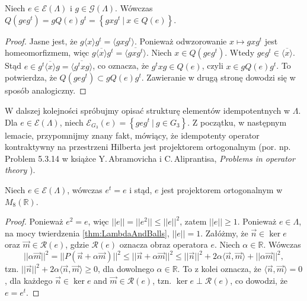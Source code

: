 {\begin{Lemma}
    \label{lem:equivClassesOfQe}
    Niech $e \in \mathcal{E}(\Lambda)$ i $g \in \mathcal{G}(\Lambda)$.
    Wówczas $Q(g e g^{t}) = g Q(e) g^{t} =
    \left \{ g x g^{t} \: | \: x \in Q(e) \right \}$.
\end{Lemma}
\begin{proof}
    Jasne jest, że $g \langle x \rangle g^{t} = \langle g x g^{t} \rangle$.
Ponieważ odwzorowanie $x \mapsto g x g^{t}$ jest homeomorfizmem,
więc $g \overline{\langle x \rangle} g^{t} = \overline{\langle g x g^{t} \rangle}$.
Niech $x \in Q(g e g^{t})$.
Wtedy $g e g^{t} \in \overline{\langle x \rangle}$.
Stąd $e \in g^{t} \overline{\langle x \rangle} g = \overline{\langle g^{t} x g \rangle}$,
co oznacza, że $g^{t} x g \in Q(e)$, czyli
    $x \in g Q(e) g^{t}$.
To potwierdza, że
    $Q(g e g^{t}) \subset g Q(e) g^{t}$.
Zawieranie w drugą stronę dowodzi się w sposób analogiczny.
\end{proof}

W dalszej kolejności spróbujmy opisać strukturę elementów idempotentnych w $\Lambda$.
Dla $e \in \mathcal{E}(\Lambda)$,
niech $\mathcal{E}_{G_{3}}(e) = \left \{ g e g^{t} \: | \: g \in G_{3} \right \}$.
Z początku, w następnym lemacie, przypomnijmy znany fakt,
mówiący, że idempotenty operator kontraktywny na przestrzeni Hilberta
jest projektorem ortogonalnym
(por. np. Problem 5.3.14 w książce
Y.\,Abramovicha i  C.\,Aliprantisa,
\emph{Problems in operator theory}
\cite{Abramovich2002}).
\begin{Lemma}
    \label{lem:eIsProj}
    Niech $e \in \mathcal{E}(\Lambda)$, wówczas $e^{t} = e$ i stąd,
    $e$ jest projektorem ortogonalnym w $M_{8}(\mathbb{R})$.
\end{Lemma}
\begin{proof}
    Ponieważ $e^{2} = e$, więc $||e|| = ||e^{2}|| \leq ||e||^{2}$,
    zatem $||e|| \geq 1$.
    Ponieważ $e \in \Lambda$, na mocy twierdzenia \ref{thm:LambdaAndBalls},
    $||e|| =1$.
Załóżmy, że $\vec{n} \in \ker e$ oraz $\vec{m} \in \mathcal{R}(e)$,
gdzie $\mathcal{R}(e)$ oznacza obraz operatora $e$.
Niech $\alpha \in \mathbb{R}$.
Wówczas
\begin{equation}
    || \alpha \vec{m} ||^{2} = || P (\vec{n} + \alpha \vec{m}) ||^{2} \leq
    || \vec{n} + \alpha \vec{m}||^{2} \leq ||\vec{n}||^{2} +
        2 \alpha \langle \vec{n}, \vec{m} \rangle + || \alpha \vec{m}||^{2},
\end{equation}
tzn. $||\vec{n}||^{2} + 2 \alpha  \langle \vec{n}, \vec{m} \rangle \geq 0$,
dla dowolnego $\alpha \in \mathbb{R}$.
To z kolei oznacza, że
$\langle \vec{n}, \vec{m} \rangle = 0$,
dla każdego  $\vec{n} \in \ker e$ and $\vec{m} \in \mathcal{R}(e)$,
tzn.
$\ker e \perp \mathcal{R}(e)$, co dowodzi, że $e = e^{t}$.
\end{proof}

}
